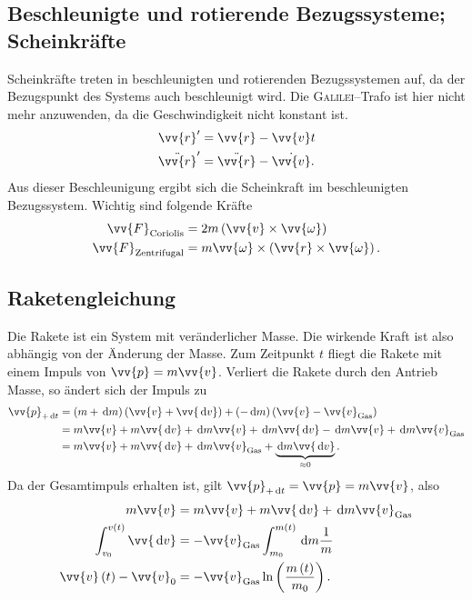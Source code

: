 \subsection{Beschleunigte und rotierende Bezugssysteme; Scheinkräfte}
Scheinkräfte treten in beschleunigten und rotierenden Bezugssystemen auf, da der Bezugspunkt des Systems auch beschleunigt wird.
Die \textsc{Galilei}--Trafo ist hier nicht mehr anzuwenden, da die Geschwindigkeit nicht konstant ist.
\begin{align} 
        \vv{r}'&=\vv{r}-\vv{v}t\\
        \ddot{\vv{r}}'&=\ddot{\vv{r}}-\dot{\vv{v}}
.\end{align} 
Aus dieser Beschleunigung ergibt sich die Scheinkraft im beschleunigten Bezugssystem.
Wichtig sind folgende Kräfte
\begin{align} 
        \vv{F}_\text{Coriolis}&=2m\left(\vv{v}\times \vv{\omega }\right)\\
        \vv{F}_\text{Zentrifugal}&=m\vv{\omega }\times \left(\vv{r}\times \vv{\omega }\right)
.\end{align} 

\subsection{Raketengleichung}
Die Rakete ist ein System mit veränderlicher Masse.
Die wirkende Kraft ist also abhängig von der Änderung der Masse.
Zum Zeitpunkt $t$ fliegt die Rakete mit einem Impuls von $\vv{p}=m\vv{v}$. 
Verliert die Rakete durch den Antrieb Masse, so ändert sich der Impuls zu
\begin{align} 
        \vv{p}_{+\td t}&=\left(m+\td m\right)\left(\vv{v}+\vv{\td v}\right)+\left(-\td m\right)\left(\vv{v}-\vv{v}_\text{Gas}\right)\\
              &=m\vv{v}+m\vv{\td v}+\td m\vv{v}+\td m\vv{\td v}-\td m \vv{v}+\td m \vv{v}_\text{Gas}\\
              &=m\vv{v}+m\vv{\td v}+\td m \vv{v}_\text{Gas}+\underbrace{\td m\vv{\td v}}_{\approx 0}
.\end{align} 
Da der Gesamtimpuls erhalten ist, gilt $\vv{p}_{+\td t}=\vv{p}=m\vv{v}$, also
\begin{align} 
        m\vv{v}&=m\vv{v}+m\vv{\td v}+\td m \vv{v}_\text{Gas}\\
        \int_{v_0}^{v\left(t\right)}\vv{\td v}&=-\vv{v}_\text{Gas}\int_{m_0}^{m\left(t\right)}\td m\dfrac{1}{m}\\
        \vv{v}\left(t\right)-\vv{v}_0&=-\vv{v}_\text{Gas}\ln\left(\dfrac{m\left(t\right)}{m_0}\right)
.\end{align} 

